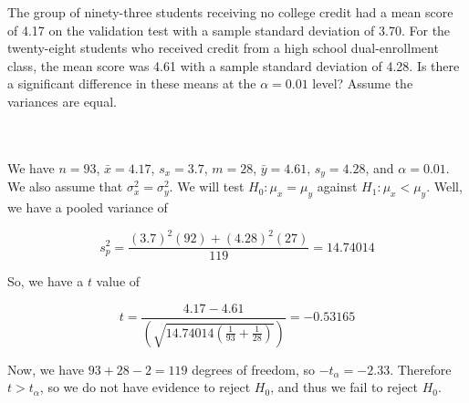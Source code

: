 The group of ninety-three students receiving no college credit had a mean score of 4.17 on the
validation test with a sample standard deviation of 3.70. For the twenty-eight students who received
credit from a high school dual-enrollment class, the mean score was 4.61 with a sample standard
deviation of 4.28. Is there a significant difference in these means at the $\alpha=0.01$ level? Assume
the variances are equal.\\\\

\begin{solution}\renewcommand{\qedsymbol}{}\ \\
    We have $n=93$, $\bar{x}=4.17$, $s_x=3.7$, $m=28$, $\bar{y}=4.61$, $s_y=4.28$, and $\alpha=0.01$. We
    also assume that $\sigma_x^2=\sigma_y^2$. We will test $H_0:\mu_x=\mu_y$ against $H_1:\mu_x<\mu_y$.
    Well, we have a pooled variance of
    
    $$s_p^2=\frac{(3.7)^2(92)+(4.28)^2(27)}{119}=14.74014$$
    
    So, we have a $t$ value of
    
    $$t=\frac{4.17-4.61}{(\sqrt{14.74014(\frac{1}{93}+\frac{1}{28})})}=-0.53165$$
    
    Now, we have $93+28-2=119$ degrees of freedom, so $-t_{\alpha}=-2.33$. Therefore $t>t_{\alpha}$, so
    we do not have evidence to reject $H_0$, and thus we fail to reject $H_0$.

\end{solution}